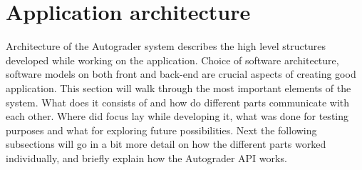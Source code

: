 



\section{Application architecture}
Architecture of the Autograder system describes the high level structures developed while working on the application. Choice of software architecture, software models on both front and back-end are crucial aspects of creating good application. This section will walk through the most important elements of the system. What does it consists of and how do different parts communicate with each other. Where did focus lay while developing it, what was done for testing purposes and what for exploring future possibilities. Next the following subsections will go in a bit more detail on how the different parts worked individually, and briefly explain how the Autograder API works.

